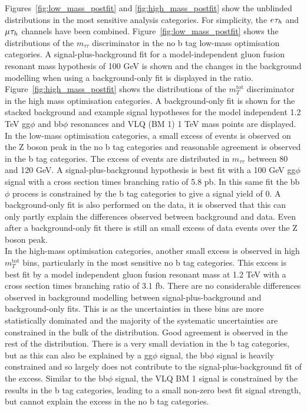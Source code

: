 Figures~\ref{fig:low_mass_postfit} and \ref{fig:high_mass_postfit} show the unblinded distributions in the most sensitive analysis categories.
For simplicity, the $e_{}\tau_{h}$ and $\mu_{}\tau_{h}$ channels have been combined.
Figure~\ref{fig:low_mass_postfit} shows the distributions of the $m_{\tau\tau}$ discriminator in the no b tag low-mass optimisation categories. 
A signal-plus-background fit for a model-independent gluon fusion resonant mass hypothesis of 100 GeV is shown and the changes in the background modelling when using a background-only fit is displayed in the ratio.
Figure~\ref{fig:high_mass_postfit} shows the distributions of the $m_{T}^{\text{tot}}$ discriminator in the high mass optimisation categories.
A background-only fit is shown for the stacked background and example signal hypotheses for the model independent 1.2 TeV gg$\phi$ and bb$\phi$ resonances and VLQ (BM 1) 1 TeV mass points are displayed. \\

In the low-mass optimisation categories, a small excess of events is observed on the Z boson peak in the no b tag categories and reasonable agreement is observed in the b tag categories.
The excess of events are distributed in $m_{\tau\tau}$ between 80 and 120 GeV.
A signal-plus-background hypothesis is best fit with a 100 GeV gg$\phi$ signal with a cross section times branching ratio of 5.8 pb. 
In this same fit the bb$\phi$ process is constrained by the b tag categories to give a signal yield of 0.
A background-only fit is also performed on the data, it is observed that this can only partly explain the differences observed between background and data.
Even after a background-only fit there is still an small excess of data events over the Z boson peak. \\

In the high-mass optimisation categories, another small excess is observed in high $m_{T}^{\text{tot}}$ bins, particularly in the most sensitive no b tag categories.
This excess is best fit by a model independent gluon fusion resonant mass at 1.2 TeV with a cross section times branching ratio of 3.1 fb.
There are no considerable differences observed in background modelling between signal-plus-background and background-only fits.
This is as the uncertainties in these bins are more statistically dominated and the majority of the systematic uncertainties are constrained in the bulk of the distribution.
Good agreement is observed in the rest of the distribution.
There is a very small deviation in the b tag categories, but as this can also be explained by a gg$\phi$ signal, the bb$\phi$ signal is heavily constrained and so largely does not contribute to the signal-plus-background fit of the excess.
Similar to the bb$\phi$ signal, the VLQ BM 1 signal is constrained by the results in the b tag categories, leading to a small non-zero best fit signal strength, but cannot explain the excess in the no b tag categories. \\

